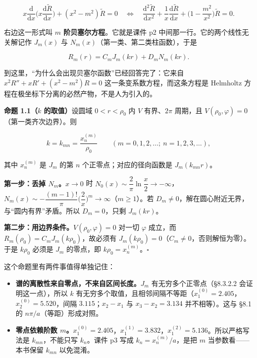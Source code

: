 \begin{equation}
x\frac{\mathrm d}{\mathrm dx}\Big(x\frac{\mathrm d\tilde R}{\mathrm dx}\Big)+(x^2-m^2)\tilde R=0
\quad\Longleftrightarrow\quad
\frac{\mathrm d^2\tilde R}{\mathrm dx^2}+\frac1x\frac{\mathrm d\tilde R}{\mathrm dx}+\Big(1-\frac{m^2}{x^2}\Big)\tilde R=0 .
\label{eq:bessel}
\end{equation}

右边这一形式叫 \textbf{$m$ 阶贝塞尔方程}。它就是课件 p2 中间那一行。它的两个线性无关解记作 $J_m(x)$ 与 $N_m(x)$（第一类、第二类柱函数），于是

\begin{equation}
R_m(r)=C_mJ_m(kr)+D_mN_m(kr).
\label{eq:Rgen}
\end{equation}

到这里，“为什么会出现贝塞尔函数”已经回答完了：它来自 $x^2R''+xR'+(x^2-m^2)R=0$ 这一条变系数方程，而这条方程是 Helmholtz 方程在极坐标下分离的必然产物，不是人为引入的。


\textbf{命题 1.1（$k$ 的取值）}\quad 设圆域 $0<r<\rho_0$ 内 $V$ 有界、$2\pi$ 周期，且 $V(\rho_0,\varphi)=0$（第一类齐次边界）。则

\[
k=k_{mn}=\frac{x_n^{(m)}}{\rho_0}\qquad(m=0,1,2,\dots;\ n=1,2,3,\dots),
\]

其中 $x_n^{(m)}$ 是 $J_m$ 的第 $n$ 个正零点；对应的径向函数是 $J_m(k_{mn}r)$。

\pfline

\textbf{第一步：丢掉 $N_m$。}$x\to0$ 时 $N_0(x)\sim\dfrac2\pi\ln\dfrac x2\to-\infty$，$N_m(x)\sim-\dfrac{(m-1)!}{\pi}\Big(\dfrac2x\Big)^m\to\infty$（$m\ge1$）。若 $D_m\ne0$，解在圆心附近无界，与“圆内有界”矛盾。所以 $D_m=0$，只剩 $J_m(kr)$。

\textbf{第二步：用边界条件。}$V(\rho_0,\varphi)=0$ 对一切 $\varphi$ 成立，而 $R_m(\rho_0)=C_mJ_m(k\rho_0)$，故必须有 $J_m(k\rho_0)=0$（$C_m\ne0$，否则解恒为零）。于是 $k\rho_0$ 必须是 $J_m$ 的零点，即 $k\rho_0=x_n^{(m)}$。$\square$

这个命题里有两件事值得单独记住：

\begin{itemize}
  \item \textbf{谱的离散性来自零点，不来自区间长度。}$J_m$ 有无穷多个正零点（\S8.3.2.2 会证明这一点），所以 $k$ 有无穷多个取值，且相邻间隔不等距（$x_1^{(0)}=2.405$，$x_2^{(0)}=5.520$，间隔 $3.115$；$x_2-x_1$ 与 $x_3-x_2=3.134$ 并不相等）。这与 \S8.1 的 $n\pi/a$（等距）形成对照。
  \item \textbf{零点依赖阶数 $m$。}$x_1^{(0)}=2.405$，$x_1^{(1)}=3.832$，$x_1^{(2)}=5.136$。所以严格写法是 $k_{mn}$，不能只写 $k_n$。课件 p3 写成 $k_n=x_n^{(m)}/a$，是把 $m$ 当参数看——本书保留 $k_{mn}$ 以免混淆。
\end{itemize}

